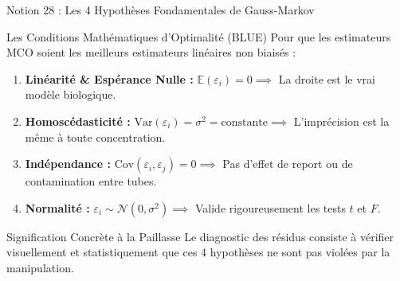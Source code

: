 \documentclass[aspectratio=169,10pt]{beamer}
\begin{document}
\begin{frame}{Notion 28 : Les 4 Hypothèses Fondamentales de Gauss-Markov}
  \begin{conceptbox}{Les Conditions Mathématiques d'Optimalité (BLUE)}
    \footnotesize
    Pour que les estimateurs MCO soient les meilleurs estimateurs linéaires non biaisés :
    \begin{enumerate}
      \item \textbf{Linéarité \& Espérance Nulle :} $\mathbb{E}(\varepsilon_i) = 0 \implies$ La droite est le vrai modèle biologique.
      \item \textbf{Homoscédasticité :} $\text{Var}(\varepsilon_i) = \sigma^2 = \text{constante} \implies$ L'imprécision est la même à toute concentration.
      \item \textbf{Indépendance :} $\text{Cov}(\varepsilon_i, \varepsilon_j) = 0 \implies$ Pas d'effet de report ou de contamination entre tubes.
      \item \textbf{Normalité :} $\varepsilon_i \sim \mathcal{N}(0, \sigma^2) \implies$ Valide rigoureusement les tests $t$ et $F$.
    \end{enumerate}
  \end{conceptbox}
  \vspace{1mm}
  \begin{biobox}{Signification Concrète à la Paillasse}
    \footnotesize
    Le diagnostic des résidus consiste à vérifier visuellement et statistiquement que ces 4 hypothèses ne sont pas violées par la manipulation.
  \end{biobox}
\end{frame}
\end{document}
